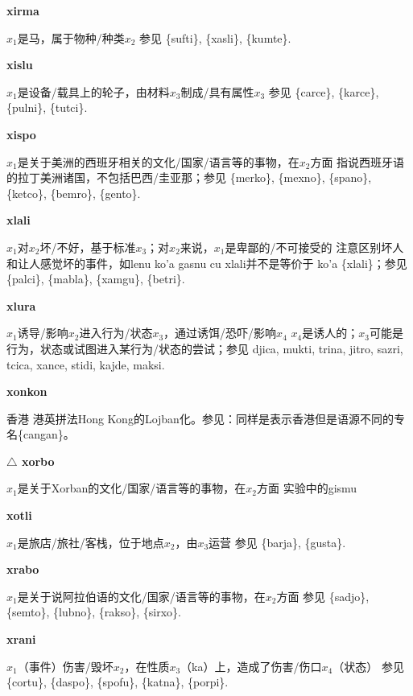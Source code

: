 \documentclass[notitlepage,twocolumn,a4paper,10pt]{book}
\begin{document}
{\sffamily\bfseries xirma}\enspace {\ttfamily\bfseries[xir     xi'a]}  $x_1$是马，属于物种\slash{}种类$x_2$ \textemdash{} 参见 \{sufti\}, \{xasli\}, \{kumte\}.

{\sffamily\bfseries xislu}\enspace {\ttfamily\bfseries[xil     xi'u]}  $x_1$是设备\slash{}载具上的轮子，由材料$x_3$制成\slash{}具有属性$x_3$ \textemdash{} 参见 \{carce\}, \{karce\}, \{pulni\}, \{tutci\}.

{\sffamily\bfseries xispo}\enspace {\ttfamily\bfseries[xip]}  $x_1$是关于美洲的西班牙相关的文化\slash{}国家\slash{}语言等的事物，在$x_2$方面 \textemdash{} 指说西班牙语的拉丁美洲诸国，不包括巴西\slash{}圭亚那；参见 \{merko\}, \{mexno\}, \{spano\}, \{ketco\}, \{bemro\}, \{gento\}.

{\sffamily\bfseries xlali}\enspace {\ttfamily\bfseries[    xla]}  $x_1$对$x_2$坏\slash{}不好，基于标准$x_3$；对$x_2$来说，$x_1$是卑鄙的\slash{}不可接受的 \textemdash{} 注意区别坏人和让人感觉坏的事件，如lenu ko'a gasnu cu xlali并不是等价于 ko'a \{xlali\}；参见 \{palci\}, \{mabla\}, \{xamgu\}, \{betri\}.

{\sffamily\bfseries xlura}\enspace {\ttfamily\bfseries[    xlu]}  $x_1$诱导\slash{}影响$x_2$进入行为\slash{}状态$x_3$，通过诱饵\slash{}恐吓\slash{}影响$x_4$ \textemdash{} $x_4$是诱人的；$x_3$可能是行为，状态或试图进入某行为\slash{}状态的尝试；参见 {djica}, {mukti}, {trina}, {jitro}, {sazri}, {tcica}, {xance}, {stidi}, {kajde}, {maksi}.

{\sffamily\bfseries xonkon} 香港 \textemdash{} 港英拼法Hong Kong的Lojban化。参见：同样是表示香港但是语源不同的专名\{cangan\}。

{\sffamily\bfseries $\triangle$ xorbo} $x_1$是关于Xorban的文化\slash{}国家\slash{}语言等的事物，在$x_2$方面 \textemdash{} 实验中的gismu

{\sffamily\bfseries xotli}  $x_1$是旅店\slash{}旅社\slash{}客栈，位于地点$x_2$，由$x_3$运营 \textemdash{} 参见 \{barja\}, \{gusta\}.

{\sffamily\bfseries xrabo}\enspace {\ttfamily\bfseries[rab]}  $x_1$是关于说阿拉伯语的文化\slash{}国家\slash{}语言等的事物，在$x_2$方面 \textemdash{} 参见 \{sadjo\}, \{semto\}, \{lubno\}, \{rakso\}, \{sirxo\}.

{\sffamily\bfseries xrani}\enspace {\ttfamily\bfseries[        xai]}  $x_1$（事件）伤害\slash{}毁坏$x_2$，在性质$x_3$（ka）上，造成了伤害\slash{}伤口$x_4$（状态） \textemdash{} 参见 \{cortu\}, \{daspo\}, \{spofu\}, \{katna\}, \{porpi\}.
\end{document}
